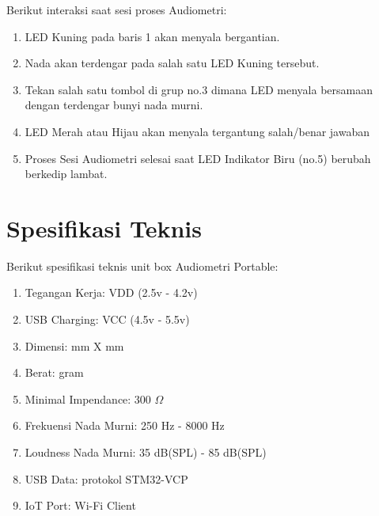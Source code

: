 \documentclass[12pt,]{article}
\begin{document}
	Berikut interaksi saat sesi proses Audiometri:
	\begin{enumerate}
		\item LED Kuning pada baris 1 akan menyala bergantian.
		\item Nada akan terdengar pada salah satu LED Kuning tersebut.
		\item Tekan salah satu tombol di grup no.3 dimana LED menyala bersamaan dengan terdengar bunyi nada murni.
		\item LED Merah atau Hijau akan menyala tergantung salah/benar jawaban
		\item Proses Sesi Audiometri selesai saat LED Indikator Biru (no.5) berubah berkedip lambat.
	\end{enumerate}

	\newpage
	\section{Spesifikasi Teknis}
	Berikut spesifikasi teknis unit box Audiometri Portable:
	
	\begin{enumerate}
		\item Tegangan Kerja: VDD (2.5v - 4.2v)
		\item USB Charging: VCC (4.5v - 5.5v)
		\item Dimensi: mm X mm
		\item Berat: gram
		\item Minimal Impendance: 300 $\Omega$
		\item Frekuensi Nada Murni: 250 Hz - 8000 Hz
		\item Loudness Nada Murni: 35 dB(SPL) - 85 dB(SPL)
		\item USB Data: protokol STM32-VCP
		\item IoT Port: Wi-Fi Client
		
	\end{enumerate}
	
\end{document}
